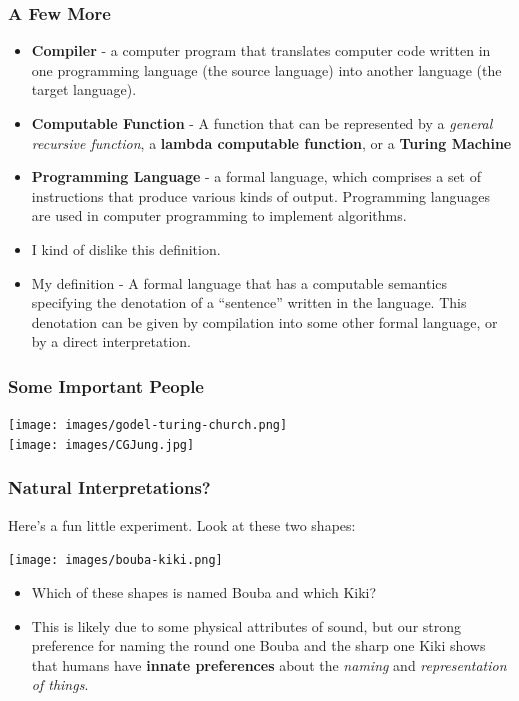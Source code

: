 \documentclass{beamer}
\begin{document}
\begin{frame}
  \frametitle{A Few More}
  \begin{itemize}
  \item \textbf{Compiler} - a computer program that translates computer code written in one programming language (the source language) into another language (the target language).
  \item<2-> \textbf{Computable Function} - A function that can be represented by a \emph{general recursive function}, a \textbf{lambda computable function}, or
    a \textbf{Turing Machine}
  \item<3-> \textbf{Programming Language} - a formal language, which comprises a set of instructions that produce various kinds of output. Programming languages are used in computer programming to implement algorithms.
  \item<4->  I kind of dislike this definition.
  \item<5-> My definition - A formal language that has a computable semantics specifying the denotation of a ``sentence'' written in the language. This denotation  can be given by compilation into some other formal language, or by a direct interpretation.
  \end{itemize}
\end{frame}

\begin{frame}
  \frametitle{Some Important People}
  \begin{center}
    \texttt{[image: images/godel-turing-church.png]}\\
    \pause
    \texttt{[image: images/CGJung.jpg]}
  \end{center}
\end{frame}

\begin{frame}
  \frametitle{Natural Interpretations?}
  Here's a fun little experiment. Look at these two shapes:
  \begin{center}
    \texttt{[image: images/bouba-kiki.png]}
  \end{center}
  \begin{itemize}
  \item<2-> Which of these shapes is named Bouba and which Kiki?
  \item<3-> This is likely due to some physical attributes of sound, but
    our strong preference for naming the round one Bouba and the
    sharp one Kiki shows that humans have \textbf{innate preferences}
    about the \emph{naming} and \emph{representation of things}.
  \end{itemize}
\end{frame}
\end{document}
